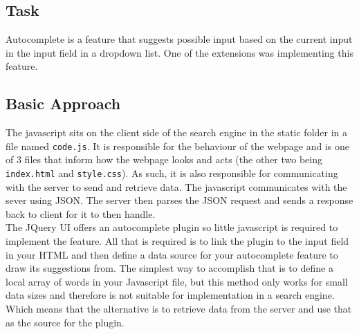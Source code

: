 \subsection{Task}
Autocomplete is a feature that suggests possible input based on the current input in the input field in a dropdown list. One of the extensions was implementing this feature.

\subsection{Basic Approach}
The javascript sits on the client side of the search engine in the static folder in a file named {\tt code.js}. It is responsible for the behaviour of the webpage and is one of 3 files that inform how the webpage looks and acts (the other two being {\tt index.html} and {\tt style.css}).
As such, it is also responsible for communicating with the server to send and retrieve data. The javascript communicates with the sever using JSON. The server then parses the JSON request and sends a response back to client for it to then handle.
\\
The JQuery UI offers an autocomplete plugin so little javascript is required to implement the feature. All that is required is to link the plugin to the input field in your HTML and then define a data source for your autocomplete feature to draw its suggestions from.
The simplest way to accomplish that is to define a local array of words in your Javascript file, but this method only works for small data sizes and therefore is not suitable for implementation in a search engine.
Which means that the alternative is to retrieve data from the server and use that as the source for the plugin.

